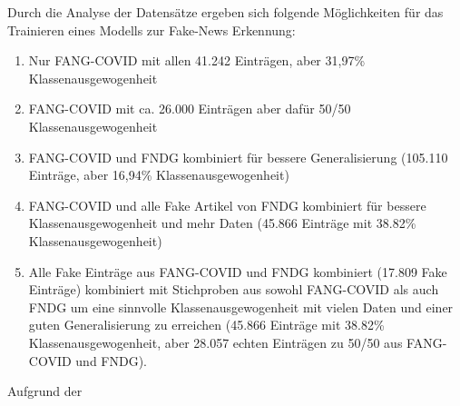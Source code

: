 Durch die Analyse der Datensätze ergeben sich folgende Möglichkeiten für das Trainieren eines Modells zur Fake-News Erkennung:
\begin{enumerate}
    \item Nur FANG-COVID mit allen 41.242 Einträgen, aber 31,97\% Klassenausgewogenheit
    \item FANG-COVID mit ca. 26.000 Einträgen aber dafür 50/50 Klassenausgewogenheit
    \item FANG-COVID und FNDG kombiniert für bessere Generalisierung (105.110 Einträge, aber 16,94\% Klassenausgewogenheit)
    \item FANG-COVID und alle Fake Artikel von FNDG kombiniert für bessere Klassenausgewogenheit und mehr Daten
    (45.866 Einträge mit 38.82\% Klassenausgewogenheit) %
    \item Alle Fake Einträge aus FANG-COVID und FNDG kombiniert (17.809 Fake Einträge) kombiniert mit Stichproben aus sowohl FANG-COVID als auch FNDG
    um eine sinnvolle Klassenausgewogenheit mit vielen Daten und einer guten Generalisierung zu erreichen (45.866 Einträge mit 38.82\% Klassenausgewogenheit,
    aber 28.057 echten Einträgen zu 50/50 aus FANG-COVID und FNDG).
\end{enumerate}

Aufgrund der %